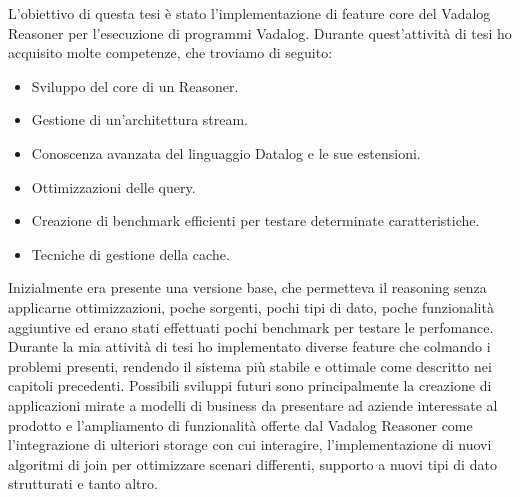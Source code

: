 L'obiettivo di questa tesi è stato l'implementazione di feature core del Vadalog Reasoner per l'esecuzione di programmi Vadalog. \newline \newline
Durante quest'attività di tesi ho acquisito molte competenze, che troviamo di seguito:
\begin{itemize}
	\item Sviluppo del core di un Reasoner.
	\item Gestione di un'architettura stream.
	\item Conoscenza avanzata del linguaggio Datalog e le sue estensioni.
	\item Ottimizzazioni delle query.
	\item Creazione di benchmark efficienti per testare determinate caratteristiche.
	\item Tecniche di gestione della cache.
\end{itemize}
Inizialmente era presente una versione base, che permetteva il reasoning senza applicarne ottimizzazioni, poche sorgenti, pochi tipi di dato, poche funzionalità aggiuntive ed erano stati effettuati pochi benchmark per testare le perfomance. \newline
Durante la mia attività di tesi ho implementato diverse feature che colmando i problemi presenti, rendendo il sistema più stabile e ottimale come descritto nei capitoli precedenti. \newline \newline
Possibili sviluppi futuri sono principalmente la creazione di applicazioni mirate a modelli di business da presentare ad aziende interessate al prodotto e l'ampliamento di funzionalità offerte dal Vadalog Reasoner come l'integrazione di ulteriori storage con cui interagire, l'implementazione di nuovi algoritmi di join per ottimizzare scenari differenti, supporto a nuovi tipi di dato strutturati e tanto altro.
